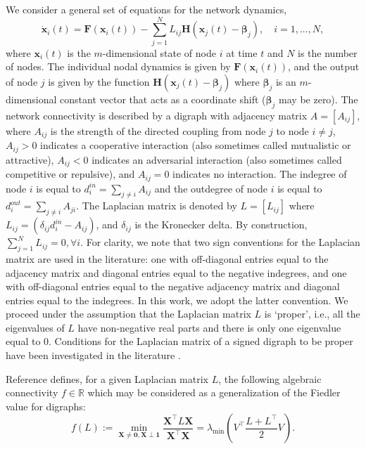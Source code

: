 \documentclass[%
 reprint,
 amsmath,amssymb,
 aip,
]{revtex4-2}
\def \bF {\pmb{F}}
\def \bH {\pmb{H}}
\def \bx {\pmb{x}}
\def \bX {\pmb{X}}
\def \bbeta {\pmb{\beta}}
\theoremstyle{italichead}
\theoremstyle{definition}
\begin{document}
{We consider a general set of equations for the network dynamics,
\begin{equation}
    \dot{\bx}_i (t)= \bF(\bx_i (t))-\sum_{j=1}^N L_{ij} \bH(\bx_j (t) - \bbeta_j), \quad i=1,...,N, \label{general}
\end{equation}
where  $\bx_i(t)$ is the $m$-dimensional state of node $i$ at time $t$ and $N$ is the number of nodes. The individual nodal dynamics is given by $\bF(\bx_i(t))$, and the output of node $j$ is given by the function $\bH(\bx_j(t) - \bbeta_j)$ where $\bbeta_j$ is an $m$-dimensional constant vector that acts as a coordinate shift ($\bbeta_j$ may be zero). {The network connectivity is described by a digraph with adjacency matrix $A=[A_{ij}]$, where  $A_{ij}$ is the strength of the directed coupling from node $j$ to node $i \neq j$, $A_{ij}>0$ indicates a cooperative interaction (also sometimes called mutualistic or attractive), $A_{ij}<0$ indicates an adversarial interaction (also sometimes called competitive or repulsive), and $A_{ij}=0$ indicates no interaction.} The indegree of node $i$ is equal to $d_i^{in}=\sum_{j \neq i} A_{ij}$ and the outdegree of node $i$ is equal to $d_i^{out}=\sum_{j \neq i} A_{ji}$. The Laplacian matrix is denoted by $L=[L_{ij}]$ where $L_{ij}= (\delta_{ij} d_i^{in} - A_{ij})$, and $\delta_{ij}$ is the Kronecker delta. By construction, $\sum_{j=1}^N L_{ij} = 0, \forall i$. {For clarity, we note that two sign conventions for the Laplacian matrix are used in the literature: one with off-diagonal entries equal to the adjacency matrix and diagonal entries equal to the negative indegrees, and one with off-diagonal entries equal to the negative adjacency matrix and diagonal entries equal to the indegrees. In this work, we adopt the latter convention.}
We proceed under the assumption that the Laplacian matrix $L$ is `proper', i.e., all the eigenvalues of  $L$ have non-negative real parts and there is only one eigenvalue equal to $0$.
Conditions for the Laplacian matrix of a signed digraph to be proper have been investigated in the literature \cite{Altafini2013Consensus,Chen2017spectral,ahmadizadeh2017eigenvalues}.


Reference \cite[Definition 2.32]{wu2007synchronization} defines, for a given Laplacian matrix $L$, the following algebraic connectivity $f \in \mathbb{R}$ which may be considered as a generalization of the Fiedler value \cite{fiedler1973algebraic}  for digraphs:
\begin{equation} \label{eq:algeb}
    f(L) := \min_{\bX \neq \pmb{0}, \bX \perp \pmb{1}} \dfrac{\bX^\top L \bX}{\bX^\top \bX} = \lambda_{\min} \left( V^\top \dfrac{L + L^\top}{2} V \right).
\end{equation}


}
\end{document}
